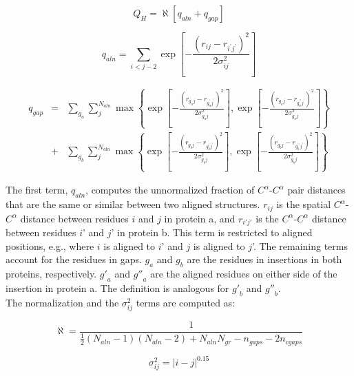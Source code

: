 \[Q_{H}=\aleph \left[ q_{aln}+q_{gap}\right] \]

\[
q_{aln}=\sum _{i<j-2}\exp \left[ -\frac{\left( r_{ij}-r_{i^{\prime }j^{\prime }}
\right)^{2}}{2\sigma ^{2}_{ij}}\right] 
\]


\begin{eqnarray}
q_{gap} &=& \sum _{g_{a}}\sum ^{N_{aln}}_{j}\max \left\{ \exp 
\left[ -\frac{\left( r_{g_{a}j}-r_{g^{\prime}_{a}j^{\prime}}\right)^{2}}
{2\sigma ^{2}_{g_{a}j}}\right] ,\exp \left[ -\frac{\left( r_{g_{a}j}-r_{g^{\prime \prime }_{a}j^
{\prime }}\right) ^{2}}{2\sigma ^{2}_{g_{a}j}}\right]\right\}\nonumber\\
&+& \sum _{g_{b}}\sum ^{N_{aln}}_{j}\max \left\{ \exp \left[ -\frac
{\left( r_{g_{b}j}-r_{g^{\prime}_{b}j^{\prime}}\right)^{2}}{2\sigma ^{2}_{g_{b}j}}\right] ,
\exp \left[ -\frac{\left( r_{g_{b}j}-r_{g^{\prime \prime }_{b}j^{\prime }}\right) ^{2}}
{2\sigma^{2}_{g_{b}j}}\right] \right\} \nonumber
\end{eqnarray}

The first term, $q_{aln}$, computes the unnormalized fraction of
$C^{\alpha}$-$C^{\alpha}$ pair distances that are the same or similar
between two aligned structures. $r_{ij}$ is the spatial
$C^{\alpha}$-$C^{\alpha}$ distance between residues $i$ and $j$ in
protein a, and $r_{i'j'}$ is the $C^{\alpha}$-$C^{\alpha}$ distance
between residues $i$' and $j$' in protein b. This term is restricted to
aligned positions, e.g., where $i$ is aligned to $i$' and $j$ is aligned
to $j$'.  The remaining terms account for the residues in gaps. $g_a$
and $g_b$ are the residues in insertions in both proteins, respectively.
${g'}_{a}$ and ${g''}_{a}$ are the aligned residues on either side of
the insertion in protein a. The definition is analogous for ${g'}_{b}$
and ${g''}_b$.\\ The normalization and the \(\sigma ^{2}_{ij} \) terms
are computed as:

\[
\aleph =\frac{1}{\frac{1}{2}\left( N_{aln}-1\right) \left( N_{aln}-2\right) +N_{aln}N_{gr}-n_{gaps}-2n_{cgaps}}\]


\[
\sigma ^{2}_{ij}=\left| i-j\right| ^{0.15} 
\]


